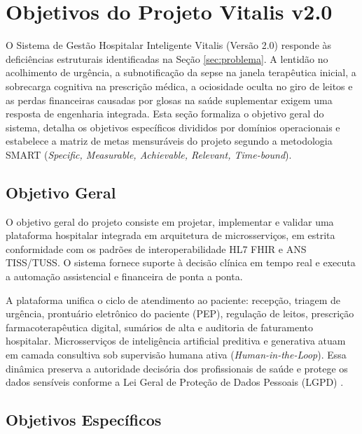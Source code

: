 
\section{Objetivos do Projeto Vitalis v2.0}
\label{sec:objetivos}

O Sistema de Gestão Hospitalar Inteligente Vitalis (Versão 2.0) responde às deficiências estruturais identificadas na Seção \ref{sec:problema}. A lentidão no acolhimento de urgência, a subnotificação da sepse na janela terapêutica inicial, a sobrecarga cognitiva na prescrição médica, a ociosidade oculta no giro de leitos e as perdas financeiras causadas por glosas na saúde suplementar exigem uma resposta de engenharia integrada. Esta seção formaliza o objetivo geral do sistema, detalha os objetivos específicos divididos por domínios operacionais e estabelece a matriz de metas mensuráveis do projeto segundo a metodologia SMART (\textit{Specific, Measurable, Achievable, Relevant, Time-bound}).

\subsection{Objetivo Geral}
\label{subsec:objetivo_geral}

O objetivo geral do projeto consiste em projetar, implementar e validar uma plataforma hospitalar integrada em arquitetura de microsserviços, em estrita conformidade com os padrões de interoperabilidade HL7 FHIR e ANS TISS/TUSS. O sistema fornece suporte à decisão clínica em tempo real e executa a automação assistencial e financeira de ponta a ponta.

A plataforma unifica o ciclo de atendimento ao paciente: recepção, triagem de urgência, prontuário eletrônico do paciente (PEP), regulação de leitos, prescrição farmacoterapêutica digital, sumários de alta e auditoria de faturamento hospitalar. Microsserviços de inteligência artificial preditiva e generativa atuam em camada consultiva sob supervisão humana ativa (\textit{Human-in-the-Loop}). Essa dinâmica preserva a autoridade decisória dos profissionais de saúde e protege os dados sensíveis conforme a Lei Geral de Proteção de Dados Pessoais (LGPD) \cite{brasil_lgpd:2018}.

\subsection{Objetivos Específicos}
\label{subsec:objetivos_especificos}

